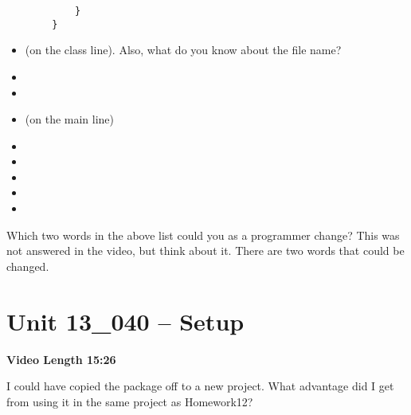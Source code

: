 \documentclass[letterpaper,12pt]{exam}
\newcommand{\unit}{Unit 13}
\begin{document}
\begin{questions}
\begin{samepage}
\begin{verbatim}
            }
        }
    \end{verbatim}
      \begin{itemize}
        \item {} (on the class line). Also, what do you know about the file name?
        \vspace{5mm}
        \item {}
        \vspace{5mm}
        \item {}
        \vspace{5mm}
        \item {} (on the main line)
        \vspace{5mm}
        \item {}
        \vspace{5mm}
        \item {}
        \vspace{5mm}
        \item {}
        \vspace{5mm}
        \item {}
        \vspace{5mm}
        \item {}
        \vspace{5mm}
       \end{itemize}
\end{samepage}

\begin{samepage}
    \question Which two words in the above list could you as a programmer change? This was not answered in the video, but think about it.  There are two words that could be changed.
    \vspace{5mm}
\end{samepage}

\section*{\unit\_040 -- Setup} 
\par{\selectfont\textbf{Video Length 15:26}}

\begin{samepage}
    \question I could have copied the package off to a new project.  What advantage did I get from using it in the same project as Homework12?
    \vspace{5mm}
\end{samepage}


\end{questions}
\end{document}
